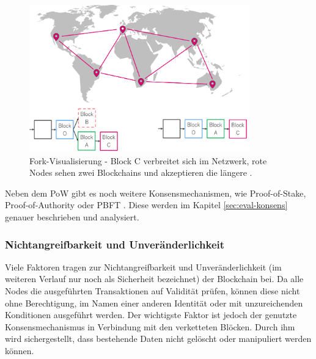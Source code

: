 \begin{figure}[!htbp]
  \centering
	\includegraphics[width=0.85\textwidth,angle=0]{images/fork_4}
 	\caption{Fork-Visualisierung - Block C verbreitet sich im Netzwerk, rote Nodes sehen zwei Blockchains und akzeptieren die längere \cite[S.~200 ff.]{AntonopoulosMasteringbitcoin2015}.}
	\label{fig:fork_4}
\end{figure}

Neben dem \acs{PoW} gibt es noch weitere Konsensmechanismen, wie Proof-of-Stake, Proof-of-Authority oder \acl{PBFT} \cite{SukhwaniPerformanceModelingPBFT2017a}\cite{DeAngelisPBFTvsproofofauthority2017}. Diese werden im Kapitel \ref{sec:eval-konsens} genauer beschrieben und analysiert.

\subsubsection{Nichtangreifbarkeit und Unveränderlichkeit}
\label{subsec:immutability}
Viele Faktoren tragen zur Nichtangreifbarkeit und Unveränderlichkeit (im weiteren Verlauf nur noch als Sicherheit bezeichnet) der Blockchain bei. Da alle Nodes die ausgeführten Transaktionen auf Validität prüfen, können diese nicht ohne Berechtigung, im Namen einer anderen Identität oder mit unzureichenden Konditionen ausgeführt werden. Der wichtigste Faktor ist jedoch der genutzte Konsensmechanismus in Verbindung mit den verketteten Blöcken. Durch ihm wird sichergestellt, dass bestehende Daten nicht gelöscht oder manipuliert werden können.

